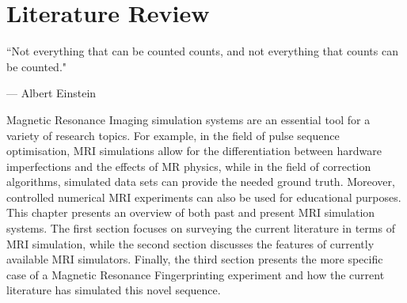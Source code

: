 \chapter{Literature Review}
\label{chapterlabel2}
\epigraph{``Not everything that can be counted counts, and not everything that counts can
be counted."}{--- \textup{Albert Einstein}}

Magnetic Resonance Imaging simulation systems are an essential tool for a variety of research topics.
For example, in the field of pulse sequence optimisation, MRI simulations allow for the differentiation between hardware imperfections and the effects of MR physics, 
while in the field of correction algorithms, simulated data sets can provide the needed ground truth.
Moreover, controlled numerical MRI experiments can also be used for educational purposes.
This chapter presents an overview of both past and present MRI simulation systems.
The first section focuses on surveying the current literature in terms of MRI simulation, while the second section discusses the features of currently available MRI simulators.
Finally, the third section presents the more specific case of a Magnetic Resonance Fingerprinting experiment and how the current literature has simulated this novel sequence.

\hfill




\clearpage


\clearpage

%



